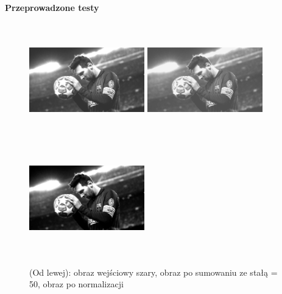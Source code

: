 \documentclass[magisterska,openany]{pracadypl}
\begin{document}
\vspace{0.25cm}\textbf{\Large Przeprowadzone testy}
\vspace{0.5cm}
\begin{figure}[h]
\centering
\includegraphics[width=5cm, height=5cm]{orgi/gMessi.jpg}
\includegraphics[width=5cm, height=5cm]{3_1/add_constG1.jpg}
\includegraphics[width=5cm, height=5cm]{3_1/nadd_constG1.jpg}
\caption{(Od lewej): obraz wejściowy szary, obraz po sumowaniu ze stałą = 50, obraz po normalizacji}
\end{figure}
\end{document}
